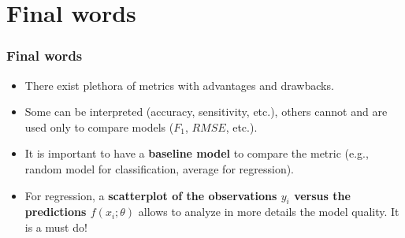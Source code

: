 \section{Final words}
\begin{frame}
\frametitle{Final words}
\begin{itemize}
\item There exist plethora of metrics with advantages and drawbacks.
\item Some can be interpreted (accuracy, sensitivity, etc.), others cannot and are used only to compare models ($F_1$, $RMSE$, etc.).
\item It is important to have a {\bf baseline model} to compare the metric (e.g., random model for classification, average for regression).
\item For regression, a {\bf scatterplot of the observations $y_i$ versus the predictions $f(x_i;\theta)$} allows to analyze in more details the model quality. It is a must do!
\end{itemize}
\end{frame}





